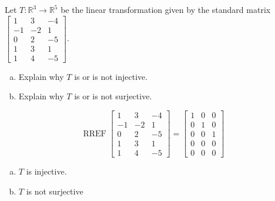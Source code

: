 
\begin{exerciseStatement}
 Let \(T:\mathbb{R}^ 3  \to \mathbb{R}^ 5 \) be the linear transformation given by the standard matrix \( \left[\begin{array}{ccc}
1 & 3 & -4 \\
-1 & -2 & 1 \\
0 & 2 & -5 \\
1 & 3 & 1 \\
1 & 4 & -5
\end{array}\right] .\)
\begin{enumerate}[(a)]
\item Explain why \(T\) is or is not injective.
\item Explain why \(T\) is or is not surjective.
\end{enumerate}
    
\end{exerciseStatement}
    
\begin{exerciseAnswer} 


\[\operatorname{RREF} \left[\begin{array}{ccc}
1 & 3 & -4 \\
-1 & -2 & 1 \\
0 & 2 & -5 \\
1 & 3 & 1 \\
1 & 4 & -5
\end{array}\right] = \left[\begin{array}{ccc}
1 & 0 & 0 \\
0 & 1 & 0 \\
0 & 0 & 1 \\
0 & 0 & 0 \\
0 & 0 & 0
\end{array}\right] \]


\begin{enumerate}[(a)]
\item \(T\) is injective.
\item \(T\) is not surjective
\end{enumerate}
    
\end{exerciseAnswer}
    
